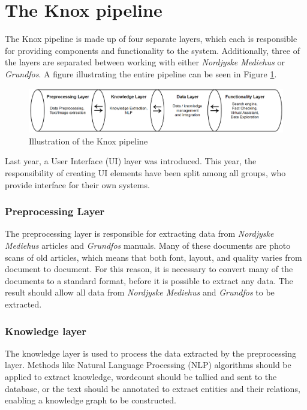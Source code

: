 \section{The Knox pipeline}\label{the_knox_pipeline}


The Knox pipeline is made up of four separate layers, which each is responsible for providing components and functionality to the system.
 Additionally, three of the layers are separated between working with either \textit{Nordjyske Mediehus} or \textit{Grundfos}.
  A figure illustrating the entire pipeline can be seen in Figure \ref{fig:pipeline}.

\begin{figure}[H]
    \centering
    \includegraphics[width=1\textwidth]{Images/Pipeline.PNG}
    \caption{Illustration of the Knox pipeline\label{fig:pipeline}}
\end{figure}

Last year, a User Interface (UI) layer was introduced. This year, the responsibility of creating UI elements have been split among all groups, who provide interface for their own systems.

\subsubsection{Preprocessing Layer}
The preprocessing layer is responsible for extracting data from \textit{Nordjyske Mediehus} articles and \textit{Grundfos} manuals. Many of these documents are photo scans of old articles, which means that both font, layout, and quality varies from document to document. For this reason, it is necessary to convert many of the documents to a standard format, before it is possible to extract any data. The result should allow all data from \textit{Nordjyske Mediehus} and \textit{Grundfos} to be extracted. 

\subsubsection{Knowledge layer}
The knowledge layer is used to process the data extracted by the preprocessing layer. Methods like Natural Language Processing (NLP) algorithms should be applied to extract knowledge, wordcount should be tallied and sent to the database, or the text should be annotated to extract entities and their relations, enabling a knowledge graph to be constructed.

